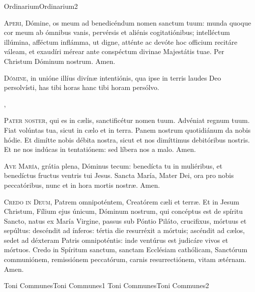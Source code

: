 \documentclass[invitatoriale-romanum.tex]{subfiles}
\begin{document}
	{Ordinarium}{Ordinarium}{2}{}{}{}{}{}{}

\begin{multicols}{2}
\lettrine{A}{peri}, Dómine, os meum ad benedicéndum nomen sanctum tuum:
munda quoque cor meum ab ómnibus vanis, pervérsis et aliénis cogitatiónibus; 
intelléctum illúmina, afféctum inflámma, ut digne, atténte ac devóte
hoc officium recitáre váleam, et exaudíri mérear
ante conspéctum divinae Majestátis tuae. Per Christum Dóminum nostrum. Amen.

\vspace{\baselineskip}
\lettrine{D}{ómine}, in unióne illíus divínæ intentiónis,
qua ipse in terris laudes Deo persolvísti,
has tibi horas  hanc tibi horam\rubric{)} persólvo.
\end{multicols}

\sep

\begin{multicols}{2}
\lettrine{P}{ater noster}, qui es in cælis, sanctificétur nomen tuum.
Advéniat regnum tuum. Fiat volúntas tua, sicut in cælo et in terra.
Panem nostrum quotidiánum da nobis hódie.
Et dimítte nobis débita nostra, sicut et nos dimíttimus debitóribus nostris.
Et ne nos indúcas in tentatiónem: sed líbera nos a malo. Amen.

\vspace{\baselineskip}
\lettrine{A}{ve María}, grátia plena, Dóminus tecum:
benedícta tu in muliéribus, et benedíctus fructus ventris tui Jesus.
Sancta María, Mater Dei, ora pro nobis peccatóribus,
nunc et in hora mortis nostræ. Amen.

\lettrine{C}{redo in Deum}, Patrem omnipoténtem, Creatórem cæli et terræ.
Et in Jesum Christum, Fílium ejus únicum, Dóminum nostrum,
qui concéptus est de spíritu Sancto, natus ex María Virgine,
passus sub Póntio Piláto, crucifixus, mórtuus et sepúltus:
descéndit ad ínferos: tértia die resurréxit a mórtuis;
ascéndit ad cælos, sedet ad déxteram Patris omnipoténtis:
inde ventúrus est judicáre vivos et mórtuos.
Credo in Spíritum sanctum, sanctam Ecclésiam cathólicam,
Sanctórum communiónem, remissiónem peccatórum,
carnis resurrectiónem, vitam ætérnam. Amen.
\end{multicols}

\pagebreak

	{Toni Communes}{Toni Communes}{1}{}{}{}{}{}{}
\vspace{-6mm}
	{Toni Communes}{Toni Communes}{2}{}{}{}{}{}{}
\end{document}
